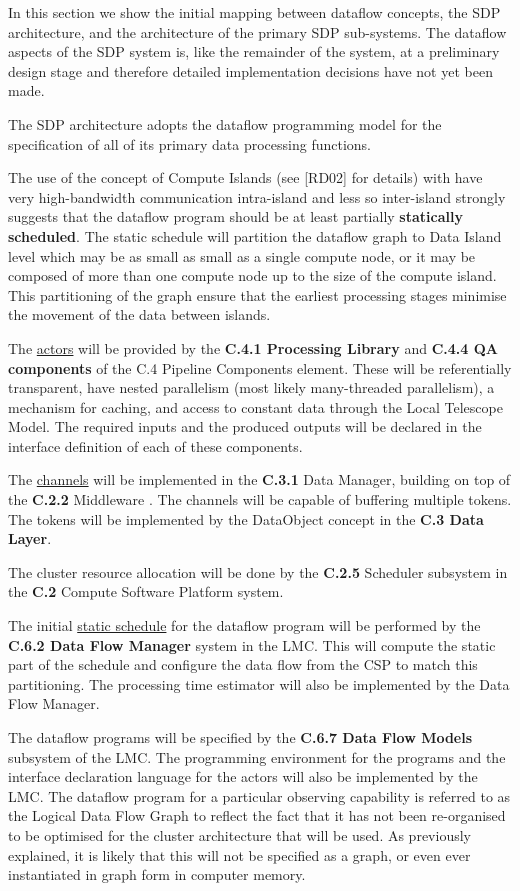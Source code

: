 \documentclass[11pt,a4paper]{article}
\begin{document}
In this section we show the initial mapping between dataflow concepts,
the SDP architecture, and the architecture of the primary SDP
sub-systems. The dataflow aspects of the SDP system is, like the
remainder of the system, at a preliminary design stage and therefore
detailed implementation decisions have not yet been made.

The SDP architecture adopts the dataflow programming model for the
specification of all of its primary data processing functions. 

The use of the concept of Compute Islands (see [RD02] for details)
with have very high-bandwidth communication intra-island and less so
inter-island strongly suggests that the dataflow program should be at
least partially {\bf statically scheduled}.  The static schedule will
partition the dataflow graph to Data Island level which may be as
small as small as a single compute node, or it may be composed of more
than one compute node up to the size of the compute island. This
partitioning of the graph ensure that the earliest processing stages
minimise the movement of the data between islands.

The \underline{actors} will be provided by the {\bf C.4.1 Processing
  Library} and {\bf C.4.4 QA components} of the C.4 Pipeline
Components element. These will be referentially transparent, have
nested parallelism (most likely many-threaded parallelism), a
mechanism for caching, and access to constant data through the Local
Telescope Model. The required inputs and the produced outputs will be
declared in the interface definition of each of these components.

The \underline{channels} will be implemented in the {\bf C.3.1} Data
Manager, building on top of the {\bf C.2.2} Middleware . The channels
will be capable of buffering multiple tokens.  The tokens will be
implemented by the DataObject concept in the {\bf C.3 Data Layer}.

The cluster resource allocation will be done by the {\bf C.2.5}
Scheduler subsystem in the {\bf C.2} Compute Software Platform system.

The initial \underline{static schedule} for the dataflow program will
be performed by the {\bf C.6.2 Data Flow Manager} system in the
LMC. This will compute the static part of the schedule and configure
the data flow from the CSP to match this partitioning. The processing
time estimator will also be implemented by the Data Flow Manager.

The dataflow programs will be specified by the {\bf C.6.7 Data Flow
  Models} subsystem of the LMC.  The programming environment for the
programs and the interface declaration language for the actors will
also be implemented by the LMC.  The dataflow program for a particular
observing capability is referred to as the Logical Data Flow Graph to
reflect the fact that it has not been re-organised to be optimised for
the cluster architecture that will be used. As previously explained,
it is likely that this will not be specified as a graph, or even ever
instantiated in graph form in computer memory.
\end{document}
